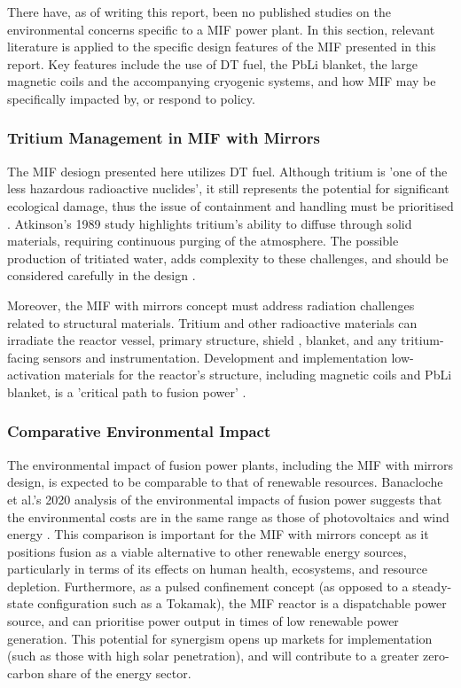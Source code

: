 There have, as of writing this report, been no published studies on the environmental concerns specific to a MIF power plant. In this section, relevant literature is applied to the specific design features of the MIF presented in this report. Key features include the use of DT fuel, the PbLi blanket, the large magnetic coils and the accompanying cryogenic systems, and how MIF may be specifically impacted by, or respond to policy.

\subsubsection{Tritium Management in MIF with Mirrors}

The MIF desiogn presented here utilizes DT fuel. Although tritium is 'one of the less hazardous radioactive nuclides', it still represents the potential for significant ecological damage, thus the issue of containment and handling must be prioritised \cite{hirsch1974nuclear}. Atkinson's 1989 study highlights tritium's ability to diffuse through solid materials, requiring continuous purging of the atmosphere. The possible production of tritiated water, adds complexity to these challenges, and should be considered carefully in the design \cite{atkinson1989environmental}.

Moreover, the MIF with mirrors concept must address radiation challenges related to structural materials. Tritium and other radioactive materials can irradiate the reactor vessel, primary structure, shield , blanket, and any tritium-facing sensors and instrumentation. Development and implementation low-activation materials for the reactor’s structure, including magnetic coils and PbLi blanket, is a 'critical path to fusion power' \cite{moslang2005towards}. 

\subsubsection{Comparative Environmental Impact}
The environmental impact of fusion power plants, including the MIF with mirrors design, is expected to be comparable to that of renewable resources. Banacloche et al.'s 2020 analysis of the environmental impacts of fusion power suggests that the environmental costs are in the same range as those of photovoltaics and wind energy \cite{banacloche2020socioeconomic}. This comparison is important for the MIF with mirrors concept as it positions fusion as a viable alternative to other renewable energy sources, particularly in terms of its effects on human health, ecosystems, and resource depletion. Furthermore, as a pulsed confinement concept (as opposed to a steady-state configuration such as a Tokamak), the MIF reactor is a dispatchable power source, and can prioritise power output in times of low renewable power generation. This potential for synergism opens up markets for implementation (such as those with high solar penetration), and will contribute to a greater zero-carbon share of the energy sector.

